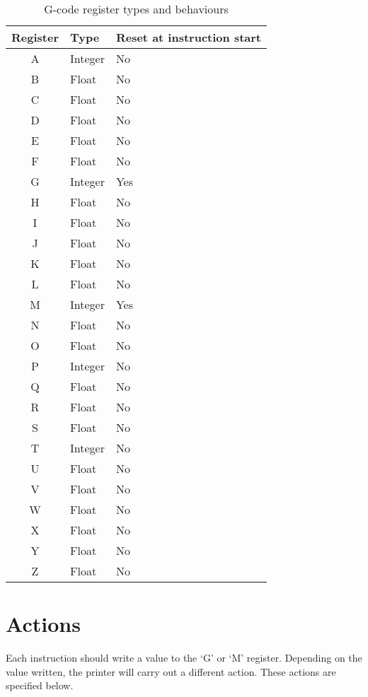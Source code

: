 			\begin{table}
				\centering
				\begin{tabular}{c l l}
					\toprule
					Register & Type & Reset at instruction start \\
					\midrule
						A & Integer & No  \\
						B & Float   & No  \\
						C & Float   & No  \\
						D & Float   & No  \\
						E & Float   & No  \\
						F & Float   & No  \\
						G & Integer & Yes \\
						H & Float   & No  \\
						I & Float   & No  \\
						J & Float   & No  \\
						K & Float   & No  \\
						L & Float   & No  \\
						M & Integer & Yes \\
						N & Float   & No  \\
						O & Float   & No  \\
						P & Integer & No  \\
						Q & Float   & No  \\
						R & Float   & No  \\
						S & Float   & No  \\
						T & Integer & No  \\
						U & Float   & No  \\
						V & Float   & No  \\
						W & Float   & No  \\
						X & Float   & No  \\
						Y & Float   & No  \\
						Z & Float   & No  \\
					\bottomrule
				\end{tabular}
				
				\caption{G-code register types and behaviours}
				\label{tab:gcoderegisters}
			\end{table}
	
	\section{Actions}
		
		\label{sec:gcodeactions}
		
		Each instruction should write a value to the `G' or `M' register. Depending
		on the value written, the printer will carry out a different action. These
		actions are specified below.
		
